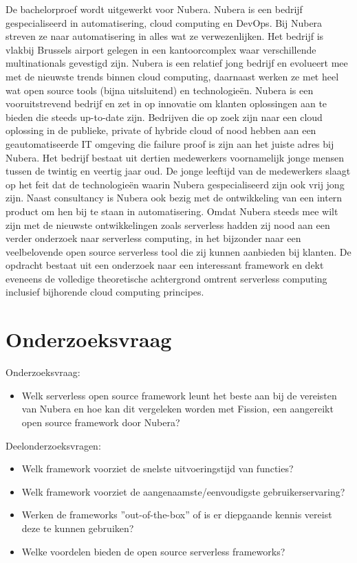De bachelorproef wordt uitgewerkt voor Nubera. Nubera is een bedrijf gespecialiseerd in automatisering, cloud computing en DevOps. Bij Nubera streven ze naar automatisering in alles wat ze verwezenlijken. Het bedrijf is vlakbij Brussels airport gelegen in een kantoorcomplex waar verschillende multinationals gevestigd zijn. Nubera is een relatief jong bedrijf en evolueert mee met de nieuwste trends binnen cloud computing, daarnaast werken ze met heel wat open source tools (bijna uitsluitend) en technologieën. Nubera is een vooruitstrevend bedrijf en zet in op innovatie om klanten oplossingen aan te bieden die steeds up-to-date zijn. Bedrijven die op zoek zijn naar een cloud oplossing in de publieke, private of hybride cloud of nood hebben aan een geautomatiseerde IT omgeving die failure proof is zijn aan het juiste adres bij Nubera. Het bedrijf bestaat uit dertien medewerkers voornamelijk jonge mensen tussen de twintig en veertig jaar oud. De jonge leeftijd van de medewerkers slaagt op het feit dat de technologieën waarin Nubera gespecialiseerd zijn ook vrij jong zijn. Naast consultancy is Nubera ook bezig met de ontwikkeling van een intern product om hen bij te staan in automatisering.
Omdat Nubera steeds mee wilt zijn met de nieuwste ontwikkelingen zoals serverless hadden zij nood aan een verder onderzoek naar serverless computing, in het bijzonder naar een veelbelovende open source serverless tool die zij kunnen aanbieden bij klanten. De opdracht bestaat uit een onderzoek naar een interessant framework en dekt eveneens de volledige theoretische achtergrond omtrent serverless computing inclusief bijhorende cloud computing principes.

\section{Onderzoeksvraag}
\label{sec:onderzoeksvraag}

Onderzoeksvraag: 
\begin{itemize}
    \item Welk serverless open source framework leunt het beste aan bij de vereisten van Nubera en hoe kan dit vergeleken worden met Fission, een aangereikt open source framework door Nubera?
\end{itemize}

Deelonderzoeksvragen: 
\begin{itemize}
    \item Welk framework voorziet de snelste uitvoeringstijd van functies?
    \item Welk framework voorziet de aangenaamste/eenvoudigste gebruikerservaring?
    \item Werken de frameworks ''out-of-the-box'' of is er diepgaande kennis vereist deze te kunnen gebruiken?
    \item Welke voordelen bieden de open source serverless frameworks?
\end{itemize}

